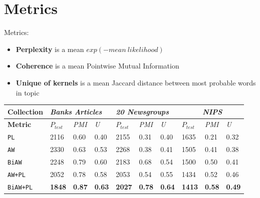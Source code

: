 \documentclass{beamer}
\begin{document}
\section*{Metrics}
\begin{frame}
	Metrics:
	\begin{itemize}
		\item \textbf{Perplexity} is a mean $exp(-mean~likelihood)$
		\item \textbf{Coherence} is a mean Pointwise Mutual Information
		\item \textbf{Unique of kernels} is a mean Jaccard distance between most probable words in topic
	\end{itemize}
	
	{\small
		\begin{table}
			\centering
			\begin{tabular}{|l|l|l|l|l|l|l|l|l|l|}
				\hline
				\textbf{Collection} & \multicolumn{3}{l|}{\textit{\textbf{Banks Articles}}}    & \multicolumn{3}{l|}{\textit{\textbf{20 Newsgroups}}} & \multicolumn{3}{l|}{\textit{\textbf{~~~~~NIPS}}}    \\ \hline
				\textbf{Metric}   & \textit{$P_{test}$} & \textit{PMI}    & \textit{U}    & \textit{$P_{test}$}  & \textit{PMI}    & \textit{U}    & \textit{$P_{test}$} & \textit{PMI}    & \textit{U}    \\ \hline
				\texttt{PL}        & 2116                & 0.60          & 0.40          & 2155                 & 0.31          & 0.40          & 1635                & 0.21          & 0.32          \\ \hline
				\texttt{AW}        & 2330                & 0.63          & 0.53          & 2268                 & 0.38          & 0.41          & 1505                & 0.41          & 0.38          \\ \hline
				\texttt{BiAW}     & 2248                & 0.79          & 0.60          & 2183                 & 0.68          & 0.54          & 1500                &  0.50          &  0.41          \\ \hline
				\texttt{AW+PL}     & 2052                & 0.78          & 0.58          & 2053                 & 0.54          & 0.55          & 1434                & 0.52          & 0.46          \\ \hline
				\texttt{BiAW+PL}  & \textbf{1848}       & \textbf{0.87} & \textbf{0.63} & \textbf{2027}        & \textbf{0.78} & \textbf{0.64} & \textbf{1413}       & \textbf{0.58} & \textbf{0.49} \\ \hline
			\end{tabular}
		\end{table}}
\end{frame}
\end{document}
